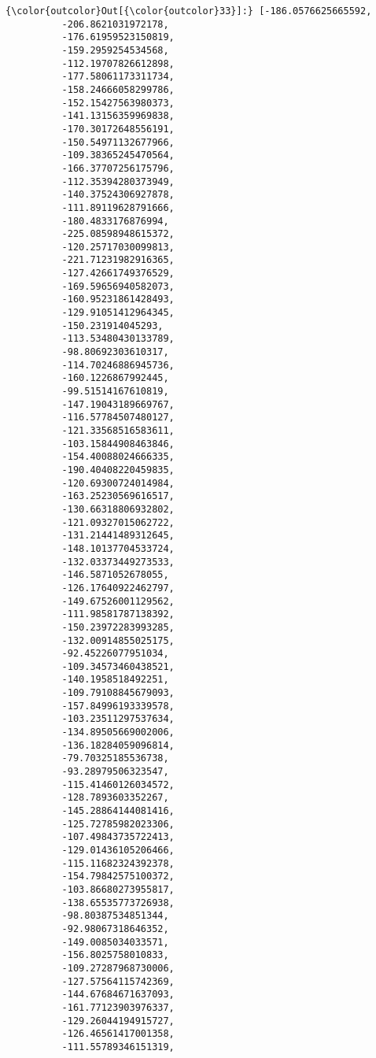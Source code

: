 \documentclass[11pt]{article}
\begin{document}
\begin{Verbatim}[commandchars=\\\{\}]
{\color{outcolor}Out[{\color{outcolor}33}]:} [-186.0576625665592,
          -206.8621031972178,
          -176.61959523150819,
          -159.2959254534568,
          -112.19707826612898,
          -177.58061173311734,
          -158.24666058299786,
          -152.15427563980373,
          -141.13156359969838,
          -170.30172648556191,
          -150.54971132677966,
          -109.38365245470564,
          -166.37707256175796,
          -112.35394280373949,
          -140.37524306927878,
          -111.89119628791666,
          -180.4833176876994,
          -225.08598948615372,
          -120.25717030099813,
          -221.71231982916365,
          -127.42661749376529,
          -169.59656940582073,
          -160.95231861428493,
          -129.91051412964345,
          -150.231914045293,
          -113.53480430133789,
          -98.80692303610317,
          -114.70246886945736,
          -160.1226867992445,
          -99.51514167610819,
          -147.19043189669767,
          -116.57784507480127,
          -121.33568516583611,
          -103.15844908463846,
          -154.40088024666335,
          -190.40408220459835,
          -120.69300724014984,
          -163.25230569616517,
          -130.66318806932802,
          -121.09327015062722,
          -131.21441489312645,
          -148.10137704533724,
          -132.03373449273533,
          -146.5871052678055,
          -126.17640922462797,
          -149.67526001129562,
          -111.98581787138392,
          -150.23972283993285,
          -132.00914855025175,
          -92.45226077951034,
          -109.34573460438521,
          -140.1958518492251,
          -109.79108845679093,
          -157.84996193339578,
          -103.23511297537634,
          -134.89505669002006,
          -136.18284059096814,
          -79.70325185536738,
          -93.28979506323547,
          -115.41460126034572,
          -128.7893603352267,
          -145.28864144081416,
          -125.72785982023306,
          -107.49843735722413,
          -129.01436105206466,
          -115.11682324392378,
          -154.79842575100372,
          -103.86680273955817,
          -138.65535773726938,
          -98.80387534851344,
          -92.98067318646352,
          -149.0085034033571,
          -156.8025758010833,
          -109.27287968730006,
          -127.57564115742369,
          -144.67684671637093,
          -161.77123903976337,
          -129.26044194915727,
          -126.46561417001358,
          -111.55789346151319,

\end{Verbatim}
\end{document}
